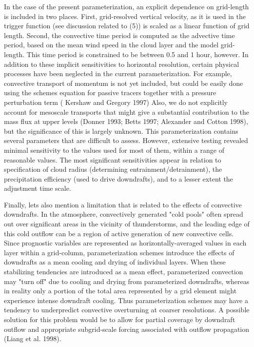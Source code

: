 In the case of the present parameterization, an explicit dependence on
grid-length is included in two places.  First, grid-resolved vertical velocity,
as it is used in the trigger function (see discussion related to (5))
is scaled as a linear function of grid length.  Second, the convective time
period is computed as the advective time period, based on the mean wind speed in
the cloud layer and the model grid-length.  This time period is constrained to
be between 0.5 and 1 hour, however.
In addition to these implicit sensitivities to horizontal resolution, certain
physical processes have been neglected in the current parameterization.
For example, convective transport of momentum is not yet included, but could be
easily done using the schemes equation for  passive tracers together with a pressure
perturbation term ( Kershaw and Gregory 1997) 
Also, we do not explicitly account for mesoscale transports
that might give a substantial contribution to the mass flux at upper levels
(Donner 1993; Betts 1997; Alexander and Cotton 1998),
but the significance of this is largely unknown.
This parameterization contains several parameters that are difficult to assess.
 However, extensive testing
revealed minimal sensitivity to the values used for most of them, within a range
of reasonable values.  The most significant sensitivities appear in relation to
specification of cloud radius (determining entrainment/detrainment), the
precipitation efficiency (used to drive downdrafts), and to a lesser extent the
adjustment time scale.

Finally, lets also mention a limitation that is related to the effects of
convective downdrafts.   
In the atmosphere, convectively generated "cold pools" often spread out
over significant areas in the vicinity of thunderstorms, and the leading edge of
this cold outflow can be a region of active generation of new convective cells.
Since  prognostic variables are represented as horizontally-averaged values in
each layer within a grid-column, parameterization schemes introduce 
the effects of downdrafts as a mean cooling and drying of individual layers.
When these stabilizing tendencies are introduced as a mean effect, parameterized
convection may "turn off" due to  cooling and drying from parameterized downdrafts,
whereas in reality only a
portion of the total area represented by a grid element might experience intense
downdraft cooling. Thus 
parameterization schemes may have a tendency to
underpredict convective overturning at coarser resolutions.  A possible solution
for this problem would be to allow for partial coverage by downdraft outflow and
appropriate subgrid-scale forcing associated with outflow propagation (Liang et
al. 1998).

